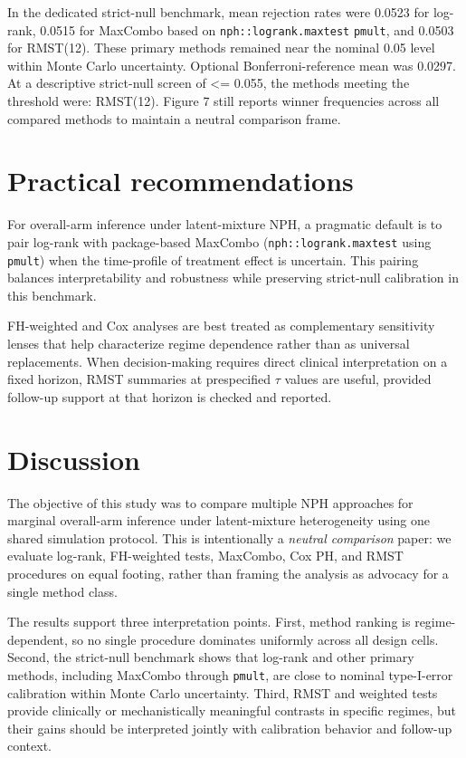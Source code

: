 \documentclass[11pt]{article}
\begin{document}
In the dedicated strict-null benchmark, mean rejection rates were 0.0523 for log-rank, 0.0515 for MaxCombo based on \texttt{nph::logrank.maxtest} \texttt{pmult}, and 0.0503 for RMST(12). These primary methods remained near the nominal 0.05 level within Monte Carlo uncertainty. Optional Bonferroni-reference mean was 0.0297. At a descriptive strict-null screen of <= 0.055, the methods meeting the threshold were: RMST(12). Figure 7 still reports winner frequencies across all compared methods to maintain a neutral comparison frame.

\section{Practical recommendations}
For overall-arm inference under latent-mixture NPH, a pragmatic default is to pair log-rank with package-based MaxCombo (\texttt{nph::logrank.maxtest} using \texttt{pmult}) when the time-profile of treatment effect is uncertain. This pairing balances interpretability and robustness while preserving strict-null calibration in this benchmark.

FH-weighted and Cox analyses are best treated as complementary sensitivity lenses that help characterize regime dependence rather than as universal replacements. When decision-making requires direct clinical interpretation on a fixed horizon, RMST summaries at prespecified $\tau$ values are useful, provided follow-up support at that horizon is checked and reported.

\section{Discussion}
The objective of this study was to compare multiple NPH approaches for marginal overall-arm inference under latent-mixture heterogeneity using one shared simulation protocol. This is intentionally a \emph{neutral comparison} paper: we evaluate log-rank, FH-weighted tests, MaxCombo, Cox PH, and RMST procedures on equal footing, rather than framing the analysis as advocacy for a single method class.

The results support three interpretation points. First, method ranking is regime-dependent, so no single procedure dominates uniformly across all design cells. Second, the strict-null benchmark shows that log-rank and other primary methods, including MaxCombo through \texttt{pmult}, are close to nominal type-I-error calibration within Monte Carlo uncertainty. Third, RMST and weighted tests provide clinically or mechanistically meaningful contrasts in specific regimes, but their gains should be interpreted jointly with calibration behavior and follow-up context.
\end{document}
